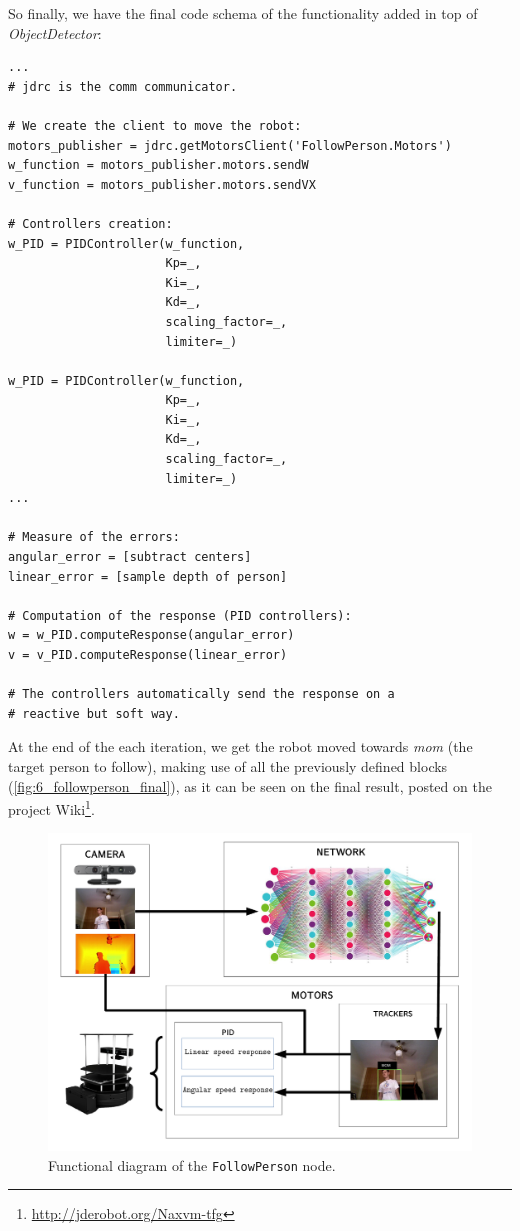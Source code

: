 	So finally, we have the final code schema of the functionality added in top of \emph{ObjectDetector}:
	
	
	\begin{lstlisting}
...
# jdrc is the comm communicator.

# We create the client to move the robot:
motors_publisher = jdrc.getMotorsClient('FollowPerson.Motors')
w_function = motors_publisher.motors.sendW
v_function = motors_publisher.motors.sendVX

# Controllers creation:
w_PID = PIDController(w_function,
                      Kp=_,
                      Ki=_,
                      Kd=_,
                      scaling_factor=_,
                      limiter=_)

w_PID = PIDController(w_function,
                      Kp=_,
                      Ki=_,
                      Kd=_,
                      scaling_factor=_,
                      limiter=_)
...

# Measure of the errors:
angular_error = [subtract centers]
linear_error = [sample depth of person]

# Computation of the response (PID controllers):
w = w_PID.computeResponse(angular_error)
v = v_PID.computeResponse(linear_error)

# The controllers automatically send the response on a
# reactive but soft way.
	\end{lstlisting}

	At the end of the each iteration, we get the robot moved towards \emph{mom} (the target person to follow), making use of all the previously defined blocks (\autoref{fig:6_followperson_final}), as it can be seen on the final result, posted on the project Wiki\footnote{\url{http://jderobot.org/Naxvm-tfg}}.


	\begin{figure}[h]
		\centering
		\includegraphics[width=5in]{images/followperson_general_schema}
		\caption{Functional diagram of the \texttt{FollowPerson} node.}
		\label{fig:6_followperson_final}
	\end{figure}

